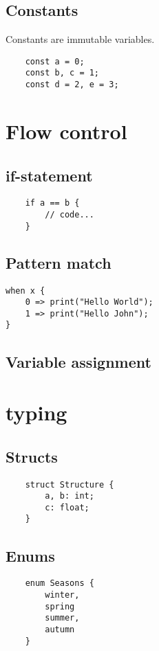 \documentclass{report}
\begin{document}
\subsection{Constants}
Constants are immutable variables.
\begin{verbatim}
    const a = 0;
    const b, c = 1;
    const d = 2, e = 3;
\end{verbatim}


\section{Flow control}

\subsection{if-statement}
\begin{verbatim}
    if a == b {
        // code...
    }
\end{verbatim}


\subsection {Pattern match}

\begin{verbatim}
when x {
    0 => print("Hello World");
    1 => print("Hello John");
}
\end{verbatim}


\subsection{Variable assignment}

\section {typing}
\subsection {Structs}
\begin{verbatim}
    struct Structure {
        a, b: int;
        c: float;
    }
    \end{verbatim}

\subsection {Enums}
\begin{verbatim}
    enum Seasons {
        winter,
        spring
        summer,
        autumn
    }
\end{verbatim}
\end{document}

